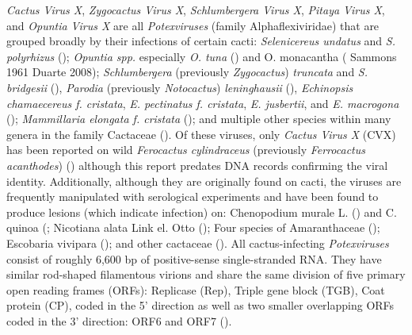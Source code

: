 \documentclass[11pt,letterpaper,titlepage]{article}
\begin{document}
\begin{linenumbers}
\textit{Cactus Virus X}, \textit{Zygocactus Virus X}, \textit{Schlumbergera Virus X}, \textit{Pitaya Virus X}, and \textit{Opuntia Virus X} are all \textit{Potexviruses} (family Alphaflexiviridae) that are grouped broadly by their infections of certain cacti: \textit{Selenicereus undatus} and \textit{S. polyrhizus} (\cite{li_viral_2015, peng_molecular_2016}); \textit{Opuntia spp.} especially \textit{O. tuna} (\cite{koenig_molecular_2004, duarte_Potexvirus_2008}) and O. monacantha (\cite{attathom_occurrence_1978} Sammons 1961 Duarte 2008); \textit{Schlumbergera} (previously \textit{Zygocactus}) \textit{truncata} and \textit{S. bridgesii}  (\cite{duarte_Potexvirus_2008, koenig_molecular_2004}), \textit{Parodia }(previously \textit{Notocactus}) \textit{leninghausii }(\cite{park_detection_2018}),  \textit{Echinopsis chamaecereus f. cristata}, \textit{E. pectinatus f. cristata}, \textit{E. jusbertii}, and \textit{E. macrogona} (\cite{maliarenko_cactus_2013}); \textit{Mammillaria elongata f. cristata} (\cite{maliarenko_cactus_2013}); and multiple other species within many genera in the family Cactaceae (\cite{evallo_brief_2021}). 
Of these viruses, only\textit{ Cactus Virus X} (CVX) has been reported on wild \textit{Ferocactus cylindraceus }(previously \textit{Ferrocactus acanthodes}) (\cite{attathom_occurrence_1978}) although this report predates DNA records confirming the viral identity. 
Additionally, although they are originally found on cacti, the viruses are frequently manipulated with serological experiments and have been found to produce lesions (which indicate infection) on: Chenopodium murale L. (\cite{maliarenko_cactus_2013}) and C. quinoa (\cite{attathom_identification_1978,attathom_occurrence_1978, brandes_untersuchungen_1963-1}; Nicotiana alata Link el. Otto (\cite{maliarenko_cactus_2013}); Four species of Amaranthaceae (\cite{attathom_identification_1978}); Escobaria vivipara (\cite{attathom_identification_1978}); and other cactaceae (\cite{attathom_identification_1978}). 
All cactus-infecting \textit{Potexviruses} consist of roughly 6,600 bp of positive-sense single-stranded RNA. They have similar rod-shaped filamentous virions and share the same division of five primary open reading frames (ORFs): Replicase (Rep), Triple gene block (TGB), Coat protein (CP), coded in the 5' direction as well as two smaller overlapping ORFs coded in the 3' direction: ORF6 and ORF7 (\cite{evallo_brief_2021,liou_complete_2004, martelli_family_2007}). 

\end{linenumbers}
\end{document}
